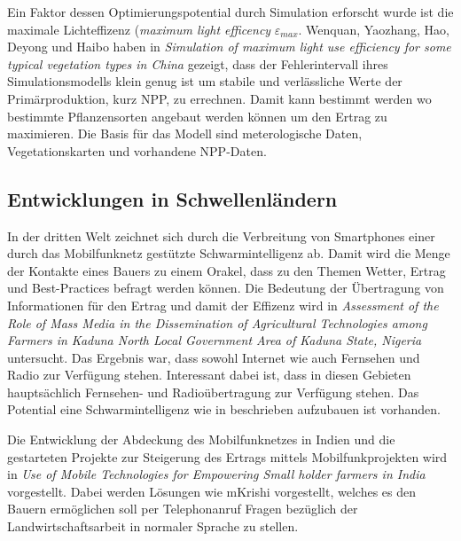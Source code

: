 Ein Faktor dessen Optimierungspotential durch Simulation erforscht wurde ist die maximale Lichteffizenz (\textit{maximum light efficency} $\varepsilon_{max}$. Wenquan, Yaozhang, Hao, Deyong und Haibo haben in \textit{Simulation of maximum light use efficiency for some typical vegetation types in China} gezeigt, dass der Fehlerintervall ihres Simulationsmodells klein genug ist um stabile und verlässliche Werte der Primärproduktion, kurz NPP, zu errechnen.  Damit kann bestimmt werden wo bestimmte Pflanzensorten angebaut werden können um den Ertrag zu maximieren. Die Basis für das Modell sind meterologische Daten, Vegetationskarten und vorhandene NPP-Daten.  \cite{jour:Zhu2006}

\subsection{Entwicklungen in Schwellenländern}

In der dritten Welt zeichnet sich durch die Verbreitung von Smartphones einer durch das Mobilfunknetz gestützte Schwarmintelligenz ab. Damit wird die Menge der Kontakte eines Bauers zu einem Orakel, dass zu den Themen Wetter, Ertrag und Best-Practices befragt werden können.\cite{jour:Razaque2013} Die Bedeutung der Übertragung von Informationen für den Ertrag und damit der Effizenz wird in \textit{Assessment of the Role of Mass Media in the Dissemination of Agricultural Technologies among Farmers in Kaduna North Local Government Area of Kaduna State, Nigeria} untersucht. Das Ergebnis war, dass sowohl Internet wie auch Fernsehen und Radio zur Verfügung stehen. Interessant dabei ist, dass in diesen Gebieten hauptsächlich Fernsehen- und Radioübertragung zur Verfügung stehen. Das Potential eine Schwarmintelligenz wie in \cite{jour:razaque2013} beschrieben aufzubauen ist vorhanden.\cite{jour:State2013}

Die Entwicklung der Abdeckung des Mobilfunknetzes in Indien und die gestarteten Projekte zur Steigerung des Ertrags mittels Mobilfunkprojekten wird in \textit{Use of Mobile Technologies for Empowering Small holder farmers in India} vorgestellt. Dabei werden Lösungen wie mKrishi vorgestellt, welches es den Bauern ermöglichen soll per Telephonanruf Fragen bezüglich der Landwirtschaftsarbeit in normaler Sprache zu stellen. \cite{article:Kokate2013}


